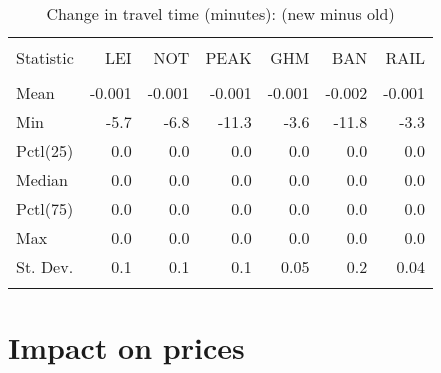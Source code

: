 \documentclass{article}\usepackage[]{graphicx}\usepackage[]{color}
\begin{document}
\begin{table}[!htbp] \centering 
  \caption{Change in travel time (minutes): (new minus old)} 
  \label{} 
\small 
\begin{tabular}{@{\extracolsep{2pt}}lD{.}{.}{-1} D{.}{.}{-1} D{.}{.}{-1} D{.}{.}{-1} D{.}{.}{-1} D{.}{.}{-1} } 
\\[-1.8ex]\hline 
\hline \\[-1.8ex] 
Statistic & LEI & NOT & PEAK & GHM & BAN & RAIL \\ 
\hline \\[-1.8ex] 
Mean & -0.001 & -0.001 & -0.001 & -0.001 & -0.002 & -0.001 \\ 
Min & -5.7 & -6.8 & -11.3 & -3.6 & -11.8 & -3.3 \\ 
Pctl(25) & 0.0 & 0.0 & 0.0 & 0.0 & 0.0 & 0.0 \\ 
Median & 0.0 & 0.0 & 0.0 & 0.0 & 0.0 & 0.0 \\ 
Pctl(75) & 0.0 & 0.0 & 0.0 & 0.0 & 0.0 & 0.0 \\ 
Max & 0.0 & 0.0 & 0.0 & 0.0 & 0.0 & 0.0 \\ 
St. Dev. & 0.1 & 0.1 & 0.1 & 0.05 & 0.2 & 0.04 \\ 
\hline \\[-1.8ex] 
\end{tabular} 
\end{table} 

\pagebreak
\section{Impact on prices}
\end{document}
